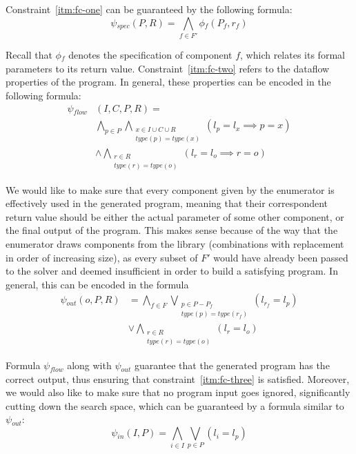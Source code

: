 Constraint~\ref{itm:fc-one} can be guaranteed by the following formula:
%
\[
  \psi{}_{spec}(P, R) = \bigwedge_{f \in F'} \phi{}_f (P_f, r_f)
\]

\noindent
Recall that $\phi{}_f$ denotes the specification of component $f$, which relates
its formal parameters to its return value.
Constraint~\ref{itm:fc-two} refers to
the dataflow properties of the program.
In general, these properties can be encoded in the
following formula:
%
\begin{align*}
  \psi{}_{flow}&(I, C, P, R) =\\
    &\bigwedge_{p \in P}
    \bigwedge_{\substack{x \in I \cup C \cup R \\ type(p) = type(x)}} 
    (l_p = l_x \implies p = x)\\
    &\wedge \bigwedge_{\substack{r \in R \\ type(r) = type(o)}}
    (l_r = l_o \implies r = o)
\end{align*}

\noindent
We would like to make sure that every component given by the enumerator is
effectively used in the generated program, meaning that their correspondent
return value should be either the actual parameter of some other component, or
the final output of the program. This makes sense because of the way that the
enumerator draws components from the library (combinations with replacement in
order of increasing size), as every subset of $F'$ would have already been
passed to the solver and deemed insufficient in order to build a satisfying
program. In general, this can be encoded in the formula
%
\begin{align*}
  \psi{}_{out}(o, P, R) &=
  \bigwedge_{f \in F}
  \bigvee_{\substack{p \in P - P_f \\ type(p) = type(r_f)}}(l_{r_f} = l_p)\\
  &\vee \bigwedge_{\substack{r \in R \\ type(r) = type(o)}} (l_{r} = l_o)
\end{align*}

\noindent
Formula $\psi{}_{flow}$ along with $\psi{}_{out}$ guarantee that the generated
program has the correct output, thus ensuring that constraint~\ref{itm:fc-three}
is satisfied. Moreover, we would also like to make sure that no program input
goes ignored, significantly cutting down the search space, which can be
guaranteed by a formula similar to $\psi{}_{out}$:
%
\[
  \psi{}_{in}(I, P) = \bigwedge_{i \in I}\bigvee_{p \in P}(l_i = l_p)
\]

